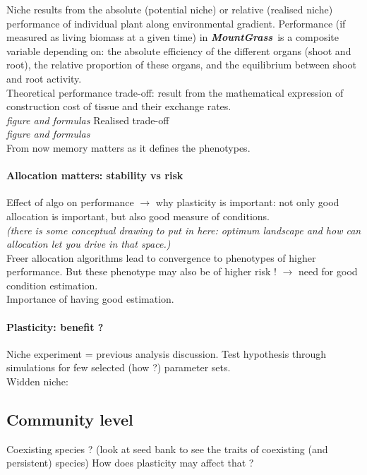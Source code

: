 \documentclass[review]{elsarticle}
\newcommand{\model}{\textbf{\textit{MountGrass}}~}
\begin{document}
Niche results from the absolute (potential niche) or relative (realised niche) performance of individual plant along environmental gradient. Performance (if measured as living biomass at a given time) in \model is a composite variable depending on: the absolute efficiency of the different organs (shoot and root), the relative proportion of these organs, and the equilibrium between shoot and root activity.\\
Theoretical performance trade-off: result from the mathematical expression of construction cost of tissue and their exchange rates.\\
\textit{figure and formulas}
Realised trade-off\\
\textit{figure and formulas}\\

From now memory matters as it defines the phenotypes.

\paragraph{Allocation matters: stability vs risk}
Effect of algo on performance 
$\rightarrow$ why plasticity is important: not only good allocation is important, but also good measure of conditions.\\
\textit{(there is some conceptual drawing to put in here: optimum landscape and how can allocation let you drive in that space.)}\\

Freer allocation algorithms lead to convergence to phenotypes of higher performance. But these phenotype may also be of higher risk ! $\rightarrow $ need for good condition estimation.\\

Importance of having good estimation.\\

\paragraph{Plasticity: benefit ?}
Niche experiment = previous analysis discussion. Test hypothesis through simulations for few selected (how ?) parameter sets.\\
Widden niche: 

\subsection{Community level}

Coexisting species ? (look at seed bank to see the traits of coexisting (and persistent) species)
How does plasticity may affect that ?
\end{document}
